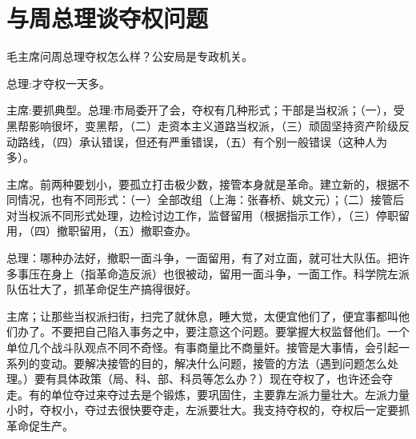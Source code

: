 \section{与周总理谈夺权问题}


毛主席问周总理夺权怎么样？公安局是专政机关。

总理:才夺权一天多。

主席:要抓典型。总理:市局委开了会，夺权有几种形式；干部是当权派；（一），受黑帮影响很坏，变黑帮，（二）走资本主义道路当权派，（三）顽固坚持资产阶级反动路线，（四）承认错误，但还有严重错误，（五）有个别一般错误（这种人为多）。

主席。前两种要划小，要孤立打击极少数，接管本身就是革命。建立新的，根据不同情况，也有不同形式：（一）全部改组（上海：张春桥、姚文元）；（二）接管后对当权派不同形式处理，边检讨边工作，监督留用（根据指示工作），（三）停职留用，（四）撤职留用，（五）撤职查办。

总理：哪种办法好，撤职一面斗争，一面留用，有了对立面，就可壮大队伍。把许多事压在身上（指革命造反派）也很被动，留用一面斗争，一面工作。科学院左派队伍壮大了，抓革命促生产搞得很好。

主席；让那些当权派扫街，扫完了就休息，睡大觉，太便宜他们了，便宜事都叫他们办了。不要把自己陷入事务之中，要注意这个问题。要掌握大权监督他们。一个单位几个战斗队观点不同不奇怪。有事商量比不商量奸。接管是大事情，会引起一系列的变动。要解决接管的目的，解决什么问题，接管的方法（遇到问题怎么处理。）要有具体政策（局、科、部、科员等怎么办？）现在夺权了，也许还会夺走。有的单位夺过来夺过去是个锻炼，要巩固住，主要靠左派力量壮大。左派力量小时，夺权小，夺过去很快要夺走，左派要壮大。我支持夺权的，夺权后一定要抓革命促生产。


